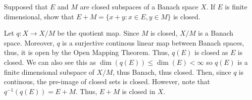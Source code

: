 \documentclass[12pt]{article}
\begin{document}
\begin{problem}{34}
    Supposed that $E$ and $M$ are closed subspaces of a Banach space $X$. If $E$ is finite dimensional, show that $E+M = \{x+y: x \in E, y \in M\}$ is closed. 
\end{problem}
\begin{solution}
    Let $q: X \to X/M$ be the quotient map. Since $M$ is closed, $X/M$ is a Banach space. Moreover, $q$ is a surjective continous linear map between Banach spaces, thus, it is open by the Open Mapping Theorem. Thus, $q(E)$ is closed as $E$ is closed. We can also see this as $\dim(q(E)) \leq \dim(E) < \infty$ so $q(E)$ is a finite dimensional subspace of $X/M$, thus Banach, thus closed. Then, since $q$ is continous, the pre-image of closed sets is closed. However, note that $q^{-1}(q(E)) = E + M$. Thus, $E + M$ is closed in $X$.
\end{solution}
\newpage 
\end{document}
